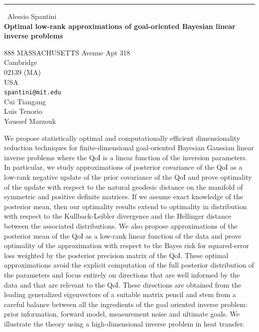 \documentclass{report}
\begin{document}
\begin{center}
\rule{6in}{1pt} \
{\large Alessio Spantini \\
{\bf Optimal low-rank approximations of goal-oriented Bayesian linear inverse problems}}

888 MASSACHUSETTS Avenue Apt 318 \\ Cambridge \\ 02139 (MA) \\ USA
\\
{\tt spantini@mit.edu}\\
Cui Tiangang\\
Luis Tenorio\\
Youssef Marzouk\end{center}

We propose statistically optimal and computationally efficient
dimensionality reduction techniques for finite-dimensional goal-oriented
Bayesian Gaussian linear inverse problems where the QoI is a linear
function of the inversion parameters. In particular, we study
approximations of posterior covariance of the QoI as a low-rank negative
update of the prior covariance of the QoI and prove optimality of the
update with respect to the natural geodesic distance on the manifold of
symmetric and positive definite matrices. If we assume exact knowledge of
the posterior mean, then our optimality results extend to optimality in
distribution with respect to the Kullback-Leibler divergence and the
Hellinger distance between the associated distributions. We also propose
approximations of the posterior mean of the QoI as a low-rank linear
function of the data and prove optimality of the approximation with
respect to the Bayes risk for squared-error loss weighted by the
posterior precision matrix of the QoI. These optimal approximations avoid
the explicit computation of the full posterior distribution of the
parameters and focus entirely on directions that are well informed by the
data and that are relevant to the QoI. These directions are obtained from
the leading generalized eigenvectors of a suitable matrix pencil and stem
from a careful balance between all the ingredients of the goal oriented
inverse problem: prior information, forward model, measurement noise and
ultimate goals. We illustrate the theory using a high-dimensional inverse
problem in heat transfer.
\end{document}
